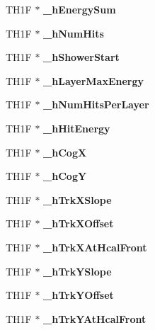 \begin{DoxyCompactItemize}
\item 
T\-H1\-F $\ast$ {\bfseries \-\_\-h\-Energy\-Sum}\label{classHcalTMVAProcessor_a4f87d18c0692f5df7320ae4372f8323a}

\item 
T\-H1\-F $\ast$ {\bfseries \-\_\-h\-Num\-Hits}\label{classHcalTMVAProcessor_abe950cfbfb7692ab9a0eff9ce1b13fe4}

\item 
T\-H1\-F $\ast$ {\bfseries \-\_\-h\-Shower\-Start}\label{classHcalTMVAProcessor_af14572f4de0c74e68e9889a135794241}

\item 
T\-H1\-F $\ast$ {\bfseries \-\_\-h\-Layer\-Max\-Energy}\label{classHcalTMVAProcessor_a43a01c577c5ffcea6ac03c4582403a45}

\item 
T\-H1\-F $\ast$ {\bfseries \-\_\-h\-Num\-Hits\-Per\-Layer}\label{classHcalTMVAProcessor_a927053a0e53266124e864d43b0545f79}

\item 
T\-H1\-F $\ast$ {\bfseries \-\_\-h\-Hit\-Energy}\label{classHcalTMVAProcessor_a8a652a8351094ade96b56b520c4ae461}

\item 
T\-H1\-F $\ast$ {\bfseries \-\_\-h\-Cog\-X}\label{classHcalTMVAProcessor_a59c2d88635f53f23f19b4f8ac0dbaa9d}

\item 
T\-H1\-F $\ast$ {\bfseries \-\_\-h\-Cog\-Y}\label{classHcalTMVAProcessor_aee553e8c73afc261adb0a1e407efd027}

\item 
T\-H1\-F $\ast$ {\bfseries \-\_\-h\-Trk\-X\-Slope}\label{classHcalTMVAProcessor_ad151e361f63f5508f974eeac8ebed55e}

\item 
T\-H1\-F $\ast$ {\bfseries \-\_\-h\-Trk\-X\-Offset}\label{classHcalTMVAProcessor_a64939191b4e6fbb6be87f4bfa928c38c}

\item 
T\-H1\-F $\ast$ {\bfseries \-\_\-h\-Trk\-X\-At\-Hcal\-Front}\label{classHcalTMVAProcessor_aded67ef40132ed0ff2c1470861430f8e}

\item 
T\-H1\-F $\ast$ {\bfseries \-\_\-h\-Trk\-Y\-Slope}\label{classHcalTMVAProcessor_a17c2a4a3a32b2a67fba024e3d284d4d4}

\item 
T\-H1\-F $\ast$ {\bfseries \-\_\-h\-Trk\-Y\-Offset}\label{classHcalTMVAProcessor_af8695ab9ecdd282d0a94669184229c3e}

\item 
T\-H1\-F $\ast$ {\bfseries \-\_\-h\-Trk\-Y\-At\-Hcal\-Front}\label{classHcalTMVAProcessor_a5ade5d7d0c9764a6e787ab77189146b1}

\end{DoxyCompactItemize}


